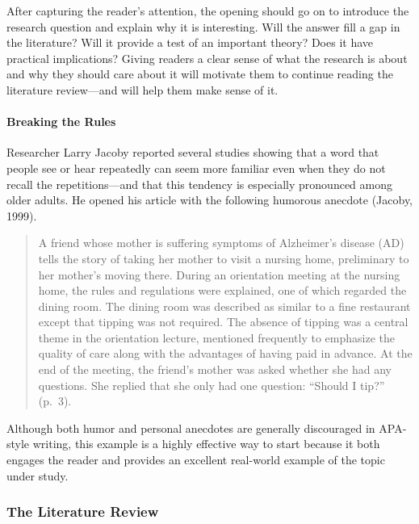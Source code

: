 \documentclass[
]{krantz}
\begin{document}
After capturing the reader's attention, the opening should go on to introduce the research question and explain why it is interesting. Will the answer fill a gap in the literature? Will it provide a test of an important theory? Does it have practical implications? Giving readers a clear sense of what the research is about and why they should care about it will motivate them to continue reading the literature review---and will help them make sense of it.

\hypertarget{breaking-the-rules}{%
\paragraph*{Breaking the Rules}\label{breaking-the-rules}}

Researcher Larry Jacoby reported several studies showing that a word that people see or hear repeatedly can seem more familiar even when they do not recall the repetitions---and that this tendency is especially pronounced among older adults. He opened his article with the following humorous anecdote (Jacoby, 1999).

\begin{quote}
A friend whose mother is suffering symptoms of Alzheimer's disease (AD) tells the story of taking her mother to visit a nursing home, preliminary to her mother's moving there. During an orientation meeting at the nursing home, the rules and regulations were explained, one of which regarded the dining room. The dining room was described as similar to a fine restaurant except that tipping was not required. The absence of tipping was a central theme in the orientation lecture, mentioned frequently to emphasize the quality of care along with the advantages of having paid in advance. At the end of the meeting, the friend's mother was asked whether she had any questions. She replied that she only had one question: ``Should I tip?'' (p.~3).
\end{quote}

Although both humor and personal anecdotes are generally discouraged in APA-style writing, this example is a highly effective way to start because it both engages the reader and provides an excellent real-world example of the topic under study.

\hypertarget{the-literature-review}{%
\subsubsection*{The Literature Review}\label{the-literature-review}}
\end{document}
